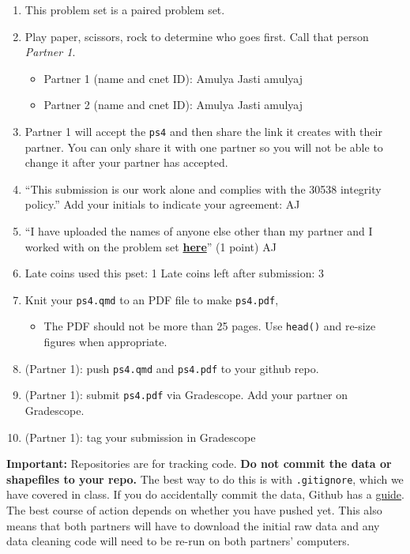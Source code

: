 \documentclass[
  letterpaper,
  DIV=11,
  numbers=noendperiod]{scrartcl}
\providecommand{\tightlist}{%
  \setlength{\itemsep}{0pt}\setlength{\parskip}{0pt}}\usepackage{longtable,booktabs,array}
\begin{document}
\begin{enumerate}
\def\labelenumi{\arabic{enumi}.}
\tightlist
\item
  This problem set is a paired problem set.
\item
  Play paper, scissors, rock to determine who goes first. Call that
  person \emph{Partner 1}.

  \begin{itemize}
  \tightlist
  \item
    Partner 1 (name and cnet ID): Amulya Jasti amulyaj
  \item
    Partner 2 (name and cnet ID): Amulya Jasti amulyaj
  \end{itemize}
\item
  Partner 1 will accept the \texttt{ps4} and then share the link it
  creates with their partner. You can only share it with one partner so
  you will not be able to change it after your partner has accepted.
\item
  ``This submission is our work alone and complies with the 30538
  integrity policy.'' Add your initials to indicate your agreement: AJ
\item
  ``I have uploaded the names of anyone else other than my partner and I
  worked with on the problem set
  \textbf{\href{https://docs.google.com/forms/d/185usrCREQaUbvAXpWhChkjghdGgmAZXA3lPWpXLLsts/edit}{here}}''
  (1 point) AJ
\item
  Late coins used this pset: 1 Late coins left after submission: 3
\item
  Knit your \texttt{ps4.qmd} to an PDF file to make \texttt{ps4.pdf},

  \begin{itemize}
  \tightlist
  \item
    The PDF should not be more than 25 pages. Use \texttt{head()} and
    re-size figures when appropriate.
  \end{itemize}
\item
  (Partner 1): push \texttt{ps4.qmd} and \texttt{ps4.pdf} to your github
  repo.
\item
  (Partner 1): submit \texttt{ps4.pdf} via Gradescope. Add your partner
  on Gradescope.
\item
  (Partner 1): tag your submission in Gradescope
\end{enumerate}

\textbf{Important:} Repositories are for tracking code. \textbf{Do not
commit the data or shapefiles to your repo.} The best way to do this is
with \texttt{.gitignore}, which we have covered in class. If you do
accidentally commit the data, Github has a
\href{https://docs.github.com/en/repositories/working-with-files/managing-large-files/about-large-files-on-github\#removing-files-from-a-repositorys-history}{guide}.
The best course of action depends on whether you have pushed yet. This
also means that both partners will have to download the initial raw data
and any data cleaning code will need to be re-run on both partners'
computers.
\end{document}
